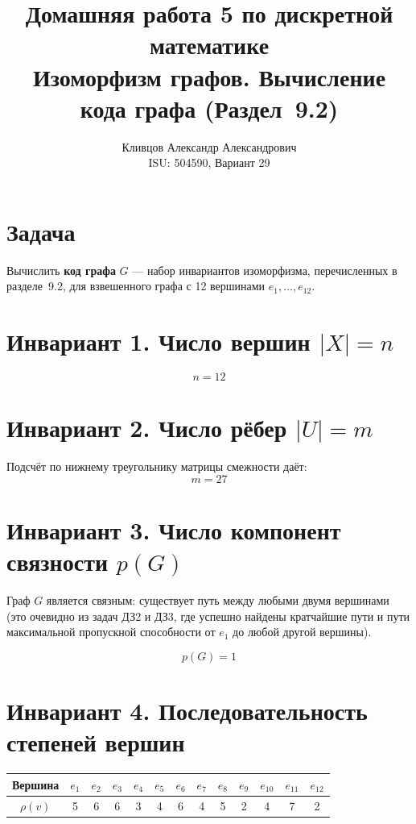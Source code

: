 \documentclass[a4paper,12pt]{article}
\title{\textbf{Домашняя работа 5 по дискретной математике}\\[0.5em]
\large Изоморфизм графов. Вычисление кода графа (Раздел~9.2)}
\author{Кливцов Александр Александрович \\ ISU: 504590, Вариант 29}
\date{}
\begin{document}
\maketitle
\thispagestyle{empty}

\section*{Задача}

Вычислить \textbf{код графа} $G$ --- набор инвариантов изоморфизма, перечисленных в
разделе~9.2, для взвешенного графа с 12 вершинами $e_1,\ldots,e_{12}$.

\section*{Инвариант 1. Число вершин $|X| = n$}

\[
	\boxed{n = 12}
\]

\section*{Инвариант 2. Число рёбер $|U| = m$}

Подсчёт по нижнему треугольнику матрицы смежности даёт:
\[
	\boxed{m = 27}
\]

\section*{Инвариант 3. Число компонент связности $p(G)$}

Граф $G$ является связным: существует путь между любыми двумя вершинами
(это очевидно из задач ДЗ2 и ДЗ3, где успешно найдены кратчайшие пути и пути
максимальной пропускной способности от $e_1$ до любой другой вершины).

\[
	\boxed{p(G) = 1}
\]

\section*{Инвариант 4. Последовательность степеней вершин}

\begin{center}
	\begin{tabular}{|c|*{12}{c|}}
		\hline
		Вершина   & $e_1$ & $e_2$ & $e_3$ & $e_4$ & $e_5$ & $e_6$ & $e_7$ & $e_8$ & $e_9$ & $e_{10}$ & $e_{11}$ & $e_{12}$ \\
		\hline
		$\rho(v)$ & 5     & 6     & 6     & 3     & 4     & 6     & 4     & 5     & 2     & 4        & 7        & 2        \\
		\hline
	\end{tabular}
\end{center}
\end{document}
